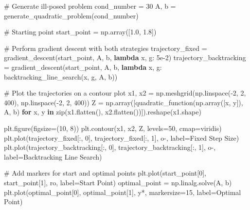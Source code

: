 \documentclass[
  russian,
  letterpaper,
  DIV=11,
  numbers=noendperiod]{scrartcl}
\newenvironment{Shaded}{\begin{snugshade}}{\end{snugshade}}
\newcommand{\BuiltInTok}[1]{\textcolor[rgb]{0.00,0.23,0.31}{#1}}
\newcommand{\CommentTok}[1]{\textcolor[rgb]{0.37,0.37,0.37}{#1}}
\newcommand{\ControlFlowTok}[1]{\textcolor[rgb]{0.00,0.23,0.31}{\textbf{#1}}}
\newcommand{\DecValTok}[1]{\textcolor[rgb]{0.68,0.00,0.00}{#1}}
\newcommand{\FloatTok}[1]{\textcolor[rgb]{0.68,0.00,0.00}{#1}}
\newcommand{\KeywordTok}[1]{\textcolor[rgb]{0.00,0.23,0.31}{\textbf{#1}}}
\newcommand{\NormalTok}[1]{\textcolor[rgb]{0.00,0.23,0.31}{#1}}
\newcommand{\OperatorTok}[1]{\textcolor[rgb]{0.37,0.37,0.37}{#1}}
\newcommand{\StringTok}[1]{\textcolor[rgb]{0.13,0.47,0.30}{#1}}
\begin{document}
\begin{enumerate}
\begin{Shaded}
\begin{Highlighting}[]
\CommentTok{\# Generate ill{-}posed problem}
\NormalTok{cond\_number }\OperatorTok{=} \DecValTok{30}
\NormalTok{A, b }\OperatorTok{=}\NormalTok{ generate\_quadratic\_problem(cond\_number)}

\CommentTok{\# Starting point}
\NormalTok{start\_point }\OperatorTok{=}\NormalTok{ np.array([}\FloatTok{1.0}\NormalTok{, }\FloatTok{1.8}\NormalTok{])}

\CommentTok{\# Perform gradient descent with both strategies}
\NormalTok{trajectory\_fixed }\OperatorTok{=}\NormalTok{ gradient\_descent(start\_point, A, b, }\KeywordTok{lambda}\NormalTok{ x, g: }\FloatTok{5e{-}2}\NormalTok{)}
\NormalTok{trajectory\_backtracking }\OperatorTok{=}\NormalTok{ gradient\_descent(start\_point, A, b, }\KeywordTok{lambda}\NormalTok{ x, g: backtracking\_line\_search(x, g, A, b))}

\CommentTok{\# Plot the trajectories on a contour plot}
\NormalTok{x1, x2 }\OperatorTok{=}\NormalTok{ np.meshgrid(np.linspace(}\OperatorTok{{-}}\DecValTok{2}\NormalTok{, }\DecValTok{2}\NormalTok{, }\DecValTok{400}\NormalTok{), np.linspace(}\OperatorTok{{-}}\DecValTok{2}\NormalTok{, }\DecValTok{2}\NormalTok{, }\DecValTok{400}\NormalTok{))}
\NormalTok{Z }\OperatorTok{=}\NormalTok{ np.array([quadratic\_function(np.array([x, y]), A, b) }\ControlFlowTok{for}\NormalTok{ x, y }\KeywordTok{in} \BuiltInTok{zip}\NormalTok{(x1.flatten(), x2.flatten())]).reshape(x1.shape)}

\NormalTok{plt.figure(figsize}\OperatorTok{=}\NormalTok{(}\DecValTok{10}\NormalTok{, }\DecValTok{8}\NormalTok{))}
\NormalTok{plt.contour(x1, x2, Z, levels}\OperatorTok{=}\DecValTok{50}\NormalTok{, cmap}\OperatorTok{=}\StringTok{\textquotesingle{}viridis\textquotesingle{}}\NormalTok{)}
\NormalTok{plt.plot(trajectory\_fixed[:, }\DecValTok{0}\NormalTok{], trajectory\_fixed[:, }\DecValTok{1}\NormalTok{], }\StringTok{\textquotesingle{}o{-}\textquotesingle{}}\NormalTok{, label}\OperatorTok{=}\StringTok{\textquotesingle{}Fixed Step Size\textquotesingle{}}\NormalTok{)}
\NormalTok{plt.plot(trajectory\_backtracking[:, }\DecValTok{0}\NormalTok{], trajectory\_backtracking[:, }\DecValTok{1}\NormalTok{], }\StringTok{\textquotesingle{}o{-}\textquotesingle{}}\NormalTok{, label}\OperatorTok{=}\StringTok{\textquotesingle{}Backtracking Line Search\textquotesingle{}}\NormalTok{)}

\CommentTok{\# Add markers for start and optimal points}
\NormalTok{plt.plot(start\_point[}\DecValTok{0}\NormalTok{], start\_point[}\DecValTok{1}\NormalTok{], }\StringTok{\textquotesingle{}ro\textquotesingle{}}\NormalTok{, label}\OperatorTok{=}\StringTok{\textquotesingle{}Start Point\textquotesingle{}}\NormalTok{)}
\NormalTok{optimal\_point }\OperatorTok{=}\NormalTok{ np.linalg.solve(A, b)}
\NormalTok{plt.plot(optimal\_point[}\DecValTok{0}\NormalTok{], optimal\_point[}\DecValTok{1}\NormalTok{], }\StringTok{\textquotesingle{}y*\textquotesingle{}}\NormalTok{, markersize}\OperatorTok{=}\DecValTok{15}\NormalTok{, label}\OperatorTok{=}\StringTok{\textquotesingle{}Optimal Point\textquotesingle{}}\NormalTok{)}


\end{Highlighting}
\end{Shaded}
\end{enumerate}
\end{document}
